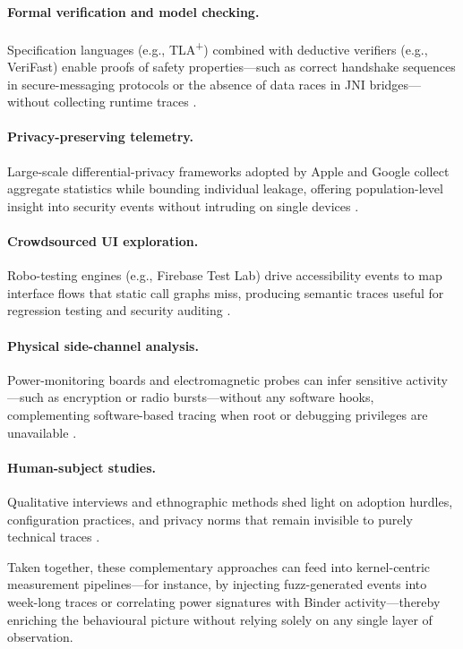 \documentclass[a4paper,12pt]{report}
\begin{document}
\paragraph{Formal verification and model checking.}  Specification languages (e.g., TLA\textsuperscript{+}) combined with deductive verifiers (e.g., VeriFast) enable proofs of safety properties—such as correct handshake sequences in secure-messaging protocols or the absence of data races in JNI bridges—without collecting runtime traces \cite{antinyan2022noise,brack2019verifast}.

\paragraph{Privacy-preserving telemetry.}  Large-scale differential-privacy frameworks adopted by Apple and Google collect aggregate statistics while bounding individual leakage, offering population-level insight into security events without intruding on single devices \cite{erlingsson2019dpframework,apple2023ppac}.

\paragraph{Crowdsourced UI exploration.}  Robo-testing engines (e.g., Firebase Test Lab) drive accessibility events to map interface flows that static call graphs miss, producing semantic traces useful for regression testing and security auditing \cite{robo2018firebase}.

\paragraph{Physical side-channel analysis.}  Power-monitoring boards and electromagnetic probes can infer sensitive activity—such as encryption or radio bursts—without any software hooks, complementing software-based tracing when root or debugging privileges are unavailable \cite{emsec2023smartphone}.

\paragraph{Human-subject studies.}  Qualitative interviews and ethnographic methods shed light on adoption hurdles, configuration practices, and privacy norms that remain invisible to purely technical traces \cite{ngo2021signaladoption}.

Taken together, these complementary approaches can feed into kernel-centric measurement pipelines—for instance, by injecting fuzz-generated events into week-long traces or correlating power signatures with Binder activity—thereby enriching the behavioural picture without relying solely on any single layer of observation.
\end{document}
